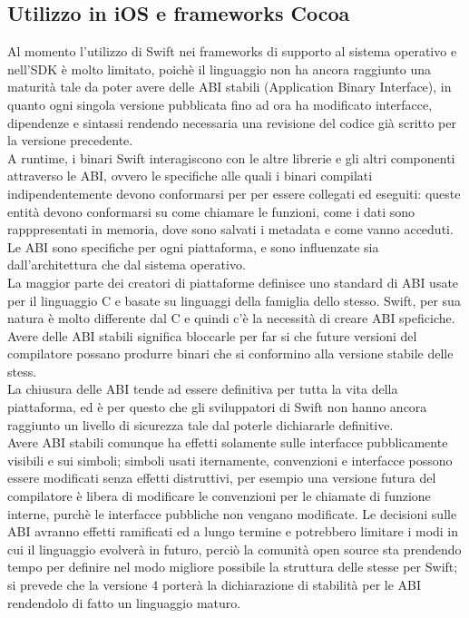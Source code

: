 \subsection{Utilizzo in iOS e frameworks Cocoa}
Al momento l'utilizzo di Swift nei frameworks di supporto al sistema operativo e nell'SDK è molto limitato, poichè il linguaggio non ha ancora raggiunto una maturità tale da poter avere delle ABI stabili (Application Binary Interface), in quanto ogni singola versione pubblicata fino ad ora ha modificato interfacce, dipendenze e sintassi rendendo necessaria una revisione del codice già scritto per la versione precedente.\\
A runtime, i binari Swift interagiscono con le altre librerie e gli altri componenti attraverso le ABI, ovvero le specifiche alle quali i binari compilati indipendentemente devono conformarsi per per essere collegati ed eseguiti: queste entità devono conformarsi su come chiamare le funzioni, come i dati sono rapppresentati in memoria, dove sono salvati i metadata e come vanno acceduti.\\
Le ABI sono specifiche per ogni piattaforma, e sono influenzate sia dall'architettura che dal sistema operativo.\\La maggior parte dei creatori di piattaforme definisce uno standard di ABI usate per il linguaggio C e basate su linguaggi della famiglia dello stesso. Swift, per sua natura è molto differente dal C e quindi c'è la necessità di creare ABI speficiche.\\
Avere delle ABI stabili significa bloccarle per far si che future versioni del compilatore possano produrre binari che si conformino alla versione stabile delle stess.\\La chiusura delle ABI tende ad essere definitiva per tutta la vita della piattaforma, ed è per questo che gli sviluppatori di Swift non hanno ancora raggiunto un livello di sicurezza tale dal poterle dichiararle definitive.\\
Avere ABI stabili comunque ha effetti solamente sulle interfacce pubblicamente visibili e sui simboli; simboli usati iternamente, convenzioni e interfacce possono essere modificati senza effetti distruttivi, per esempio una versione futura del compilatore è libera di modificare le convenzioni per le chiamate di funzione interne, purchè le interfacce pubbliche non vengano modificate.
Le decisioni sulle ABI avranno effetti ramificati ed a lungo termine e potrebbero limitare i modi in cui il linguaggio evolverà in futuro, perciò la comunità open source sta prendendo tempo per definire nel modo migliore possibile la struttura delle stesse per Swift; si prevede che la versione 4 porterà la dichiarazione di stabilità per le ABI rendendolo di fatto un linguaggio maturo.